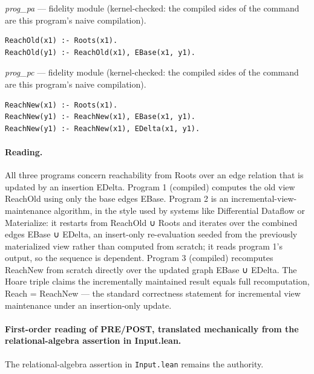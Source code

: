 \documentclass[10pt]{article}
\begin{document}
{\raggedright\textit{prog\_pa} --- fidelity module (kernel-checked: the compiled sides of the command are this program's naive compilation).\par}

\begin{Verbatim}[fontsize=\scriptsize,breaklines=true,breakanywhere=true,frame=single,framesep=1.5mm]
ReachOld(x1) :- Roots(x1).
ReachOld(y1) :- ReachOld(x1), EBase(x1, y1).
\end{Verbatim}

{\raggedright\textit{prog\_pc} --- fidelity module (kernel-checked: the compiled sides of the command are this program's naive compilation).\par}

\begin{Verbatim}[fontsize=\scriptsize,breaklines=true,breakanywhere=true,frame=single,framesep=1.5mm]
ReachNew(x1) :- Roots(x1).
ReachNew(y1) :- ReachNew(x1), EBase(x1, y1).
ReachNew(y1) :- ReachNew(x1), EDelta(x1, y1).
\end{Verbatim}

\paragraph{Reading.} All three programs concern reachability from Roots over an edge relation that is updated by an insertion EDelta. Program 1 (compiled) computes the old view ReachOld using only the base edges EBase. Program 2 is an incremental-view-maintenance algorithm, in the style used by systems like Differential Dataflow or Materialize: it restarts from ReachOld ∪ Roots and iterates over the combined edges EBase ∪ EDelta, an insert-only re-evaluation seeded from the previously materialized view rather than computed from scratch; it reads program 1's output, so the sequence is dependent. Program 3 (compiled) recomputes ReachNew from scratch directly over the updated graph EBase ∪ EDelta. The Hoare triple claims the incrementally maintained result equals full recomputation, Reach = ReachNew --- the standard correctness statement for incremental view maintenance under an insertion-only update.

\paragraph{First-order reading of PRE/POST, translated mechanically from the relational-algebra assertion in Input.lean.} The relational-algebra assertion in \texttt{Input.lean} remains the authority.
\end{document}
